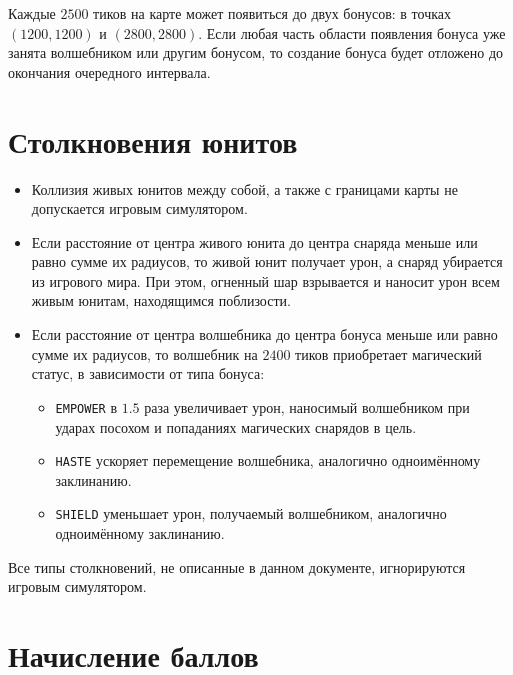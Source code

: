 Каждые $2500$ тиков на карте может появиться до двух бонусов: в точках $(1200, 1200)$ и $(2800, 2800)$. Если любая часть области появления
бонуса уже занята волшебником или другим бонусом, то создание бонуса будет отложено до окончания очередного интервала.

\section{Столкновения юнитов}

\begin{itemize}
  \item Коллизия живых юнитов между собой, а также с границами карты не допускается игровым симулятором.
  \item Если расстояние от центра живого юнита до центра снаряда меньше или равно сумме их радиусов, то живой юнит получает урон, а снаряд
        убирается из игрового мира. При этом, огненный шар взрывается и наносит урон всем живым юнитам, находящимся поблизости.
  \item Если расстояние от центра волшебника до центра бонуса меньше или равно сумме их радиусов, то волшебник на $2400$ тиков приобретает
        магический статус, в зависимости от типа бонуса:
        \begin{itemize}
            \item \texttt{EMPOWER} в $1.5$ раза увеличивает урон, наносимый волшебником при ударах посохом и попаданиях магических снарядов
                  в цель.
            \item \texttt{HASTE} ускоряет перемещение волшебника, аналогично одноимённому заклинанию.
            \item \texttt{SHIELD} уменьшает урон, получаемый волшебником, аналогично одноимённому заклинанию.
        \end{itemize}
\end{itemize}

Все типы столкновений, не описанные в данном документе, игнорируются игровым симулятором.

\section{Начисление баллов}


